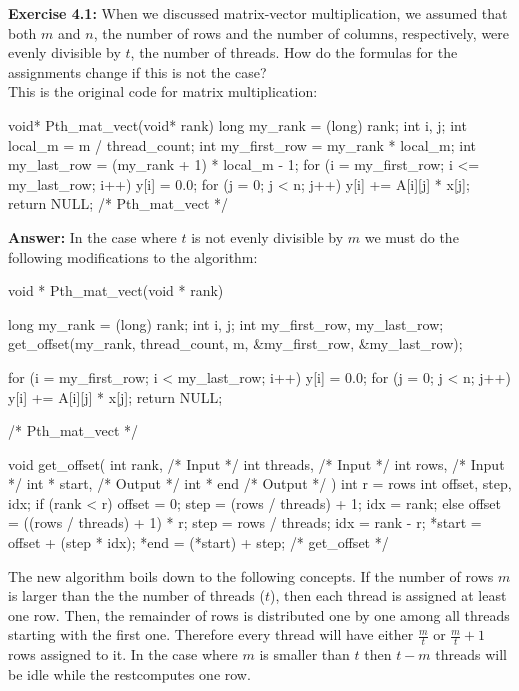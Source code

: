 \documentclass[12pt]{article}
\begin{document}
\textbf{Exercise 4.1:} When we discussed matrix-vector multiplication, we assumed that both $m$ and $n$, the number of rows and the number of columns, respectively, were evenly divisible by $t$, the number of threads. How do the formulas for the assignments change if this is not the case? \\[10pt] This is the original code for matrix multiplication:

\begin{Csource}
void* Pth_mat_vect(void* rank) {
    long my_rank = (long) rank;
    int i, j;
    int local_m = m / thread_count;
    int my_first_row = my_rank * local_m;
    int my_last_row = (my_rank + 1) * local_m - 1;
    for (i = my_first_row; i <= my_last_row; i++) { 
        y[i] = 0.0;
        for (j = 0; j < n; j++) {
            y[i] += A[i][j] * x[j];
        }
    }
    return NULL;
} /* Pth_mat_vect */
\end{Csource}

\pagebreak

\textbf{Answer:} In the case where $t$ is not evenly divisible by $m$ we must do the following modifications to the algorithm:

\begin{Csource}
void * Pth_mat_vect(void * rank) {
  long my_rank = (long) rank;
  int i, j;
  int my_first_row, my_last_row;
  get_offset(my_rank, thread_count, m, 
    &my_first_row, &my_last_row);

  for (i = my_first_row; i < my_last_row; i++) {
    y[i] = 0.0;
    for (j = 0; j < n; j++) {
      y[i] += A[i][j] * x[j];
    }
  }
  return NULL;
} /* Pth_mat_vect */

void get_offset( int rank,    /* Input */
                 int threads, /* Input */
                 int rows,    /* Input */
                 int * start, /* Output */
                 int * end    /* Output */ ) {
  int r = rows %
  int offset, step, idx;
  if (rank < r) {
    offset = 0;
    step = (rows / threads) + 1;
    idx = rank;
  } else {
    offset = ((rows / threads) + 1) * r;
    step = rows / threads;
    idx = rank - r;
  }
  *start = offset + (step * idx);
  *end = (*start) + step;
} /* get_offset */
\end{Csource}

The new algorithm boils down to the following concepts. If the number of rows $m$ is larger than the the number of threads ($t$), then each thread is assigned at least one row. Then, the remainder of rows is distributed one by one among all threads starting with the first one. Therefore every thread will have either $\frac{m}{t}$ or $\frac{m}{t} + 1$ rows assigned to it. In the case where $m$ is smaller than $t$ then $t-m$ threads will be idle while the restcomputes one row.
\end{document}

